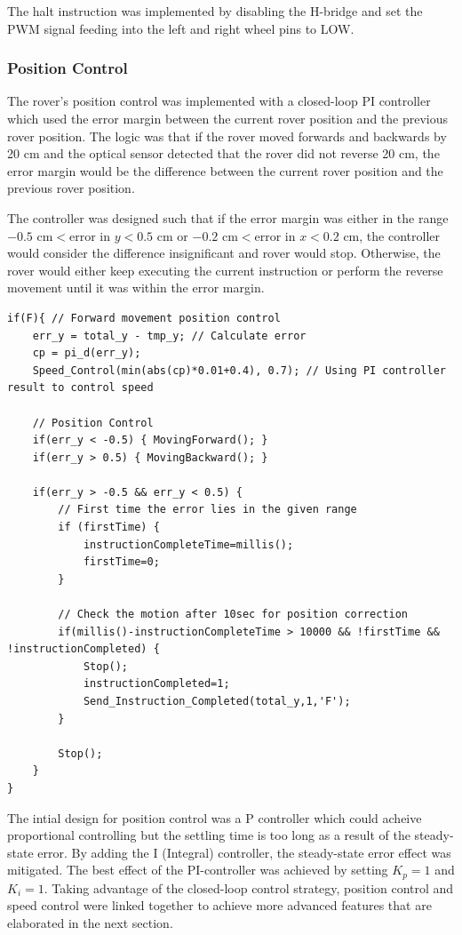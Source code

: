 \documentclass[11pt, a4paper]{article}
\begin{document}
The halt instruction was implemented by disabling the H-bridge and set the PWM signal feeding into the left and right wheel pins to LOW.

\subsubsection{Position Control}

The rover's position control was implemented with a closed-loop PI controller which used the error margin between the current rover position and the previous rover position. The logic was that if the rover moved forwards and backwards by 20 cm and the optical sensor detected that the rover did not reverse 20 cm, the error margin would be the difference between the current rover position and the previous rover position.  

The controller was designed such that if the error margin was either in the range $-0.5 \text{ cm} < \text{error in } y < 0.5 \text{ cm}$ or $-0.2 \text{ cm}  < \text{error in } x < 0.2\text{ cm}  $, the controller would consider the difference insignificant and rover would stop. Otherwise, the rover would either keep executing the current instruction or perform the reverse movement until it was within the error margin. 

\begin{lstlisting}
if(F){ // Forward movement position control
    err_y = total_y - tmp_y; // Calculate error
    cp = pi_d(err_y);
    Speed_Control(min(abs(cp)*0.01+0.4), 0.7); // Using PI controller result to control speed

    // Position Control
    if(err_y < -0.5) { MovingForward(); }
    if(err_y > 0.5) { MovingBackward(); }

    if(err_y > -0.5 && err_y < 0.5) {
        // First time the error lies in the given range
        if (firstTime) {
            instructionCompleteTime=millis();
            firstTime=0; 
        } 

        // Check the motion after 10sec for position correction
        if(millis()-instructionCompleteTime > 10000 && !firstTime && !instructionCompleted) {
            Stop();
            instructionCompleted=1;
            Send_Instruction_Completed(total_y,1,'F');        
        }

        Stop();
    }       
}
\end{lstlisting}

The intial design for position control was a P controller which could acheive proportional controlling but the settling time is too long as a result of the steady-state error. By adding the I (Integral) controller, the steady-state error effect was mitigated. The best effect of the PI-controller was achieved by setting $K_p = 1$ and $K_i = 1$. Taking advantage of the closed-loop control strategy, position control and speed control were linked together to achieve more advanced features that are elaborated in the next section. 
\end{document}
